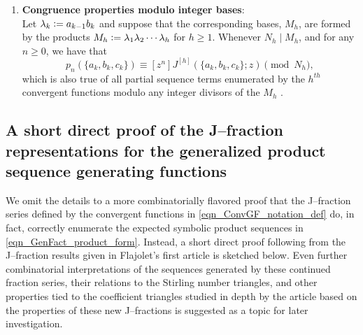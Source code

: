 \documentclass[12pt,reqno]{article}
\numberwithin{sfootnote}{section}
\numberwithin{equation}{section}
\newcommand{\itemlabel}[1]{\textbf{#1}: \\ }
\theoremstyle{DefaultTheoremStyle}
\theoremstyle{definition}
\newcommand{\cf}[0]{cf.\ }
\newcommand{\defequals}{\ensuremath{\vcentcolon=}}
\begin{document}
\begin{enumerate}
\item \itemlabel{Congruence properties modulo integer bases} 
Let $\lambda_k \defequals a_{k-1} b_{k}$ and suppose that the 
corresponding bases, $M_h$, are formed by the products 
$M_h \defequals \lambda_1 \lambda_2 \cdots \lambda_h$ for $h \geq 1$. 
Whenever $N_h \mid M_h$, and for any $n \geq 0$, we have that 
\begin{equation} 
\label{eqn_EnumProps_Of_JTypeCFracs_congruence_rels-stmt_v1} 
p_n(\{a_k, b_k, c_k\}) \equiv [z^n] J^{[h]}(\{a_k, b_k, c_k\}; z) \pmod{N_h}, 
\end{equation} 
which is also true of all partial sequence terms enumerated by the 
$h^{th}$ convergent functions modulo any integer divisors of the $M_h$ 
\citep[\cf \S 5.7]{GFLECT}. 

\end{enumerate} 

\subsection{A short direct proof of the J--fraction representations for the 
            generalized product sequence generating functions} 
\label{subSection_GenCFrac_Reps_for_GenFactFns} 

We omit the details to a more combinatorially flavored proof that the 
J--fraction series defined by the convergent functions in 
\eqref{eqn_ConvGF_notation_def} do, in fact, correctly enumerate the expected 
symbolic product sequences in \eqref{eqn_GenFact_product_form}. 
Instead, a short direct proof following from the J--fraction results 
given in Flajolet's first article is sketched below. 
Even further combinatorial interpretations of the sequences generated by 
these continued fraction series, 
their relations to the Stirling number triangles, and other 
properties tied to the coefficient triangles studied in depth by the article 
\citep{MULTIFACTJIS} based on the properties of these new 
J--fractions is suggested as a topic for later investigation. 
\end{document}

